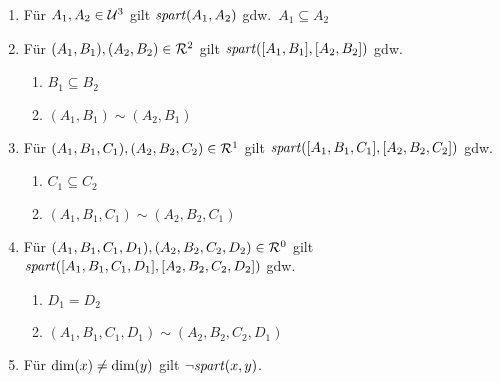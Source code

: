     \begin{enumerate}
        \item Für $A_1, A_2 \in \mathcal{U}^3$ gilt $\mathit{spart}(A_1,A_2)$ gdw.\ $A_1 \subseteq A_2$		
        \item Für $(A_1,B_1), (A_2,B_2) \in \mathcal{R}^2$ gilt
        $\mathit{spart}([A_1,B_1],[A_2,B_2])$ gdw.\ 
            \begin{enumerate}
                \item $B_1 \subseteq B_2$
                \item $(A_1, B_1) \sim (A_2, B_1)$
            \end{enumerate}
        \item Für $(A_1,B_1,C_1), (A_2,B_2,C_2) \in \mathcal{R}^1$ gilt
        $\mathit{spart}([A_1,B_1,C_1],[A_2,B_2,C_2])$ gdw.\ 
            \begin{enumerate}
                \item $C_1 \subseteq C_2$
                \item $(A_1, B_1, C_1) \sim (A_2, B_2, C_1)$
            \end{enumerate}
        \item Für $(A_1,B_1,C_1,D_1), (A_2,B_2,C_2,D_2) \in \mathcal{R}^0$ gilt
        $\mathit{spart}([A_1,B_1,C_1,D_1],[A_2,B_2,C_2,D_2])$ gdw.\
            \begin{enumerate}
                \item $D_1 = D_2$
                \item $(A_1, B_1, C_1, D_1) \sim (A_2, B_2, C_2, D_1)$
            \end{enumerate}
        \item Für $\text{dim}(x) \neq \text{dim}(y)$ gilt $\neg \mathit{spart}(x,y)$.
    \end{enumerate}
 


